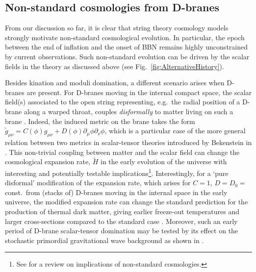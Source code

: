 \subsection{Non-standard cosmologies from D-branes}
\label{ssec:DST} 

From our discussion so far, it is clear that string theory cosmology models strongly motivate non-standard cosmological evolution. In particular, the epoch between the end of inflation and the onset of BBN remains highly unconstrained by current observations. Such non-standard evolution can be driven by the scalar fields in the theory as discussed above (see Fig.~\ref{fig:AlternativeHistory}).

Besides kination and moduli domination, a different scenario arises when D-branes are present. For D-branes moving in the internal compact space, the scalar field(s) associated to the open string representing, e.g.~the radial position of a D-brane along a warped throat, couples {\em disformally} to  matter living on such a brane \cite{Koivisto:2013fta}. Indeed, the induced metric on the brane takes the form $\tilde g_{\mu\nu} = C(\phi) g_{\mu\nu} + D(\phi) \partial_\mu\phi \partial_\nu\phi$, which is a particular case of the more general relation between two metrics in scalar-tensor theories introduced by Bekenstein in \cite{Bekenstein:1992pj}. This non-trivial coupling between matter and the scalar field can change the cosmological expansion rate, $\tilde H$ in the early evolution of the universe with interesting and potentially testable implications\footnote{See \cite{Allahverdi:2020bys} for a review on implications of non-standard cosmologies.}. Interestingly, for a `pure disformal' modification of the expansion rate, which arises for $C=1$, $D=D_0=$const.~from (stacks of) D-branes moving in the internal space in the early universe, the modified expansion rate can change the standard prediction for the production of thermal dark matter, giving earlier freeze-out temperatures and larger cross-sections compared to the standard case  \cite{Dutta:2016htz,Dutta:2017fcn}. 
Moreover, such an early period of D-brane scalar-tensor domination may be tested by its effect on the stochastic primordial gravitational wave background as shown in \cite{Chowdhury:2022gdc}. 
